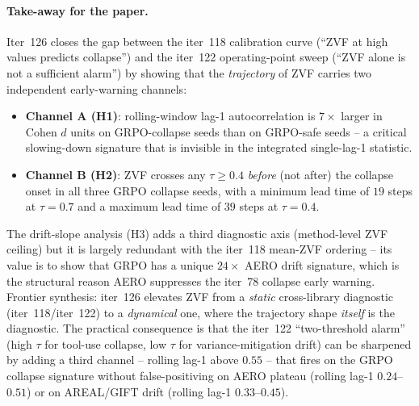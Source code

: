 \paragraph{Take-away for the paper.}
Iter~126 closes the gap between the iter~118 calibration
curve (``ZVF at high values predicts collapse'') and the
iter~122 operating-point sweep (``ZVF alone is not a sufficient
alarm'') by showing that the \emph{trajectory} of ZVF carries
two independent early-warning channels:
\begin{itemize}
\item \textbf{Channel A (H1)}: rolling-window lag-1
autocorrelation is $7\times$ larger in Cohen $d$ units on
GRPO-collapse seeds than on GRPO-safe seeds -- a critical
slowing-down signature that is invisible in the integrated
single-lag-1 statistic.
\item \textbf{Channel B (H2)}: ZVF crosses any $\tau\ge 0.4$
\emph{before} (not after) the collapse onset in all three GRPO
collapse seeds, with a minimum lead time of $19$ steps at
$\tau{=}0.7$ and a maximum lead time of $39$ steps at
$\tau{=}0.4$.
\end{itemize}
The drift-slope analysis (H3) adds a third diagnostic axis
(method-level ZVF ceiling) but it is largely redundant with the
iter~118 mean-ZVF ordering -- its value is to show that GRPO
has a unique $24\times$ AERO drift signature, which is the
structural reason AERO suppresses the iter~78 collapse early
warning.  Frontier synthesis:  iter~126 elevates ZVF from a
\emph{static} cross-library diagnostic (iter~118/iter~122) to
a \emph{dynamical} one, where the trajectory shape
\emph{itself} is the diagnostic.  The practical consequence is
that the iter~122 ``two-threshold alarm'' (high $\tau$ for
tool-use collapse, low $\tau$ for variance-mitigation drift)
can be sharpened by adding a third channel -- rolling lag-1
above $0.55$ -- that fires on the GRPO collapse signature
without false-positiving on AERO plateau (rolling lag-1
$0.24$--$0.51$) or on AREAL/GIFT drift (rolling lag-1
$0.33$--$0.45$).